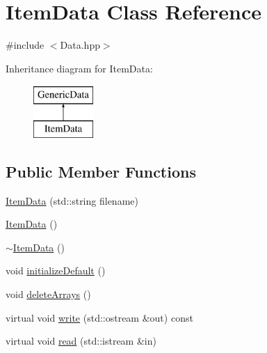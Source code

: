\hypertarget{class_item_data}{\section{Item\-Data Class Reference}
\label{class_item_data}
}


{\ttfamily \#include $<$Data.\-hpp$>$}

Inheritance diagram for Item\-Data\-:\begin{figure}[H]
\begin{center}
\leavevmode
\includegraphics[height=2.000000cm]{class_item_data}
\end{center}
\end{figure}
\subsection*{Public Member Functions}
\begin{DoxyCompactItemize}
\item 
\hyperlink{class_item_data_a0e5968ac45fac4dee76ea9f75f7752cc}{Item\-Data} (std\-::string filename)
\item 
\hyperlink{class_item_data_a3a1b6240b016a82fa65b450f98a35f6c}{Item\-Data} ()
\item 
\hyperlink{class_item_data_ae155bfaeaa7badb8611595593d88f050}{$\sim$\-Item\-Data} ()
\item 
void \hyperlink{class_item_data_a7c0fd620ea4f6043558b80330f8bf51c}{initialize\-Default} ()
\item 
void \hyperlink{class_item_data_ab4cfa6f95e0662498d3df0f23c8127d4}{delete\-Arrays} ()
\item 
virtual void \hyperlink{class_item_data_aff74199fbef4ff9f8b06c186173e69ea}{write} (std\-::ostream \&out) const 
\item 
virtual void \hyperlink{class_item_data_a71b90a70f427ee1d2417f3f0c7302c9e}{read} (std\-::istream \&in)
\end{DoxyCompactItemize}
